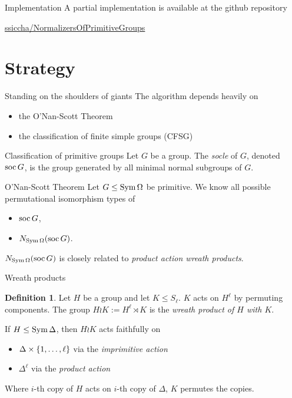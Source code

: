 \documentclass{beamer}
\theoremstyle{plain}
\theoremstyle{definition}
\newtheorem{defn}[thm]{Definition}
\begin{document}
\begin{frame}{Implementation}
A partial implementation is available at the github repository
\begin{center}
\href{https://github.com/ssiccha/NormalizersOfPrimitiveGroups}{ssiccha/NormalizersOfPrimitiveGroups}
\end{center}
\end{frame}


\section{Strategy}
\begin{frame}{Standing on the shoulders of giants}
The algorithm depends heavily on
\begin{itemize}
\item the O'Nan-Scott Theorem
\item the classification of finite simple groups (CFSG)
\end{itemize}
\end{frame}

\begin{frame}{Classification of primitive groups}
Let $G$ be a group. The \emph{socle} of $G$, denoted $\operatorname{soc} G$,
is the group generated by all minimal normal subgroups of $G$.
\\[1em]

\begin{block}{O'Nan-Scott Theorem}
    Let $G \leq \operatorname{Sym} \Omega$ be primitive.
    We know all possible permutational isomorphism types of
    \pause
    \vspace{-0.5em}
    \begin{itemize}
        \item
        $\operatorname{soc} G$,
        \item
        $N_{\operatorname{Sym} \Omega}(\operatorname{soc} G)$.
    \end{itemize}
\end{block}

$N_{\operatorname{Sym} \Omega}(\operatorname{soc} G)$ is closely related to
\emph{product action wreath products}.
\end{frame}

\begin{frame}{Wreath products}
\begin{defn}
    Let $H$ be a group and let $K \leq S_\ell$.
    $K$ acts on $H ^ \ell$ by permuting components.
    The group
    $H \wr K := H ^ \ell \rtimes K$
    is the \emph{wreath product of $H$ with $K$}.
\end{defn}

\pause
If $H \leq \operatorname{Sym} \Delta$, then $H \wr K$ acts faithfully on
\begin{itemize}
\item $\Delta \times  \left\{ 1, \ldots, \ell \right\} $ via the \emph{imprimitive action}
\item $\Delta ^ \ell$ via the \emph{product action}
\end{itemize}

Where $i$-th copy of $H$ acts on $i$-th copy of $\Delta$, $K$ permutes the copies.
\end{frame}
\end{document}
